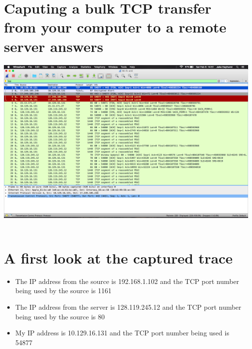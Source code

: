 \documentclass{article}
\begin{document}
\section {Caputing a bulk TCP transfer from your computer to a remote server answers}
\includegraphics[width=\textwidth]{part1TCP}\\\\

\section {A first look at the captured trace}
\begin{itemize}
  \item The IP address from the source is 192.168.1.102 and the TCP port number being used by the source is 1161
  \item The IP address from the server is 128.119.245.12 and the TCP port number being used by the source is 80
  \item My IP address is 10.129.16.131 and the TCP port number being used is 54877
\end{itemize}
\end{document}
